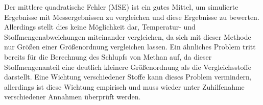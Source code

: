         Der mittlere quadratische Fehler (MSE) ist ein gutes Mittel, um simulierte Ergebnisse mit Messergebnissen zu vergleichen und diese Ergebnisse zu bewerten. Allerdings stellt dies keine Möglichkeit dar, Temperatur- und Stoffmengenabweichungen miteinander vergleichen, da sich mit dieser Methode nur Größen einer Größenordnung vergleichen lassen. Ein ähnliches Problem tritt bereits für die Berechnung des Schlupfs von Methan auf, da dieser Stoffmengenanteil eine deutlich kleinere Größenordnung als die Vergleichsstoffe darstellt. Eine Wichtung verschiedener Stoffe kann dieses Problem vermindern, allerdings ist diese Wichtung empirisch und muss wieder unter Zuhilfenahme verschiedener Annahmen überprüft werden. 